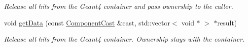 \begin{DoxyCompactItemize}
\begin{DoxyCompactList}\small\item\em Release all hits from the Geant4 container and pass ownership to the caller. \item\end{DoxyCompactList}\item 
void \hyperlink{class_d_d4hep_1_1_simulation_1_1_geant4_hit_collection_a3374851f839f6caf7eb95aa84aa4d5a8}{getData} (const \hyperlink{class_d_d4hep_1_1_component_cast}{ComponentCast} \&cast, std::vector$<$ void $\ast$ $>$ $\ast$result)
\begin{DoxyCompactList}\small\item\em Release all hits from the Geant4 container. Ownership stays with the container. \item\end{DoxyCompactList}\end{DoxyCompactItemize}
